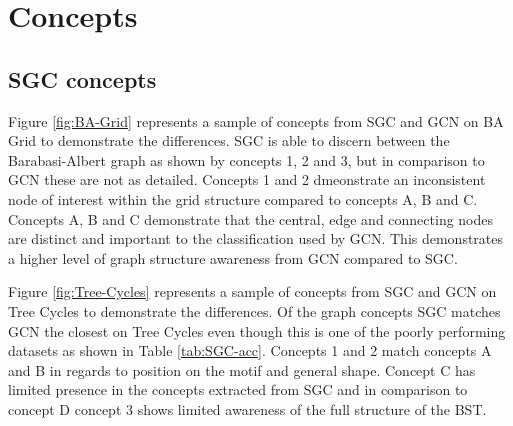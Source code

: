 \chapter{Concepts}
\label{app:concepts}

\section{SGC concepts}


Figure \ref{fig:BA-Grid} represents a sample of concepts from SGC and GCN on BA Grid to demonstrate the differences.
SGC is able to discern between the Barabasi-Albert graph as shown by concepts 1, 2 and 3, but in comparison to GCN these are not as detailed.
Concepts 1 and 2 dmeonstrate an inconsistent node of interest within the grid structure compared to concepts A, B and C.
Concepts A, B and C demonstrate that the central, edge and connecting nodes are distinct and important to the classification used by GCN.
This demonstrates a higher level of graph structure awareness from GCN compared to SGC.

Figure \ref{fig:Tree-Cycles} represents a sample of concepts from SGC and GCN on Tree Cycles to demonstrate the differences.
Of the graph concepts SGC matches GCN the closest on Tree Cycles even though this is one of the poorly performing datasets as shown in Table \ref{tab:SGC-acc}.
Concepts 1 and 2 match concepts A and B in regards to position on the motif and general shape.
Concept C has limited presence in the concepts extracted from SGC and in comparison to concept D concept 3 shows limited awareness of the full structure of the BST.

